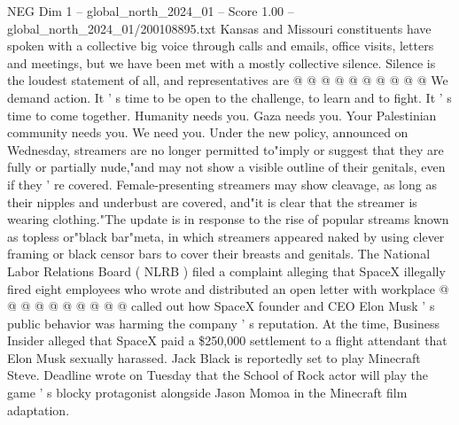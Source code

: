 \begin{textsample}{NEG Dim 1 – global\_north\_2024\_01 – Score 1.00 – global\_north\_2024\_01/200108895.txt}
Kansas and Missouri constituents have spoken with a collective big voice through calls and emails, office visits, letters and meetings, but we have been met with a mostly collective silence.
Silence is the loudest statement of all, and representatives are @ @ @ @ @ @ @ @ @ @ We demand action.
It ' s time to be open to the challenge, to learn and to fight.
It ' s time to come together.
Humanity needs you.
Gaza needs you.
Your Palestinian community needs you.
We need you.
Under the new policy, announced on Wednesday, streamers are no longer permitted to"imply or suggest that they are fully or partially nude,"and may not show a visible outline of their genitals, even if they ' re covered.
Female-presenting streamers may show cleavage, as long as their nipples and underbust are covered, and"it is clear that the streamer is wearing clothing."The update is in response to the rise of popular streams known as topless or"black bar"meta, in which streamers appeared naked by using clever framing or black censor bars to cover their breasts and genitals.
The National Labor Relations Board ( NLRB ) filed a complaint alleging that SpaceX illegally fired eight employees who wrote and distributed an open letter with workplace @ @ @ @ @ @ @ @ @ @ called out how SpaceX founder and CEO Elon Musk ' s public behavior was harming the company ' s reputation.
At the time, Business Insider alleged that SpaceX paid a \$250,000 settlement to a flight attendant that Elon Musk sexually harassed.
Jack Black is reportedly set to play Minecraft Steve.
Deadline wrote on Tuesday that the School of Rock actor will play the game ' s blocky protagonist alongside Jason Momoa in the Minecraft film adaptation.

\end{textsample}
